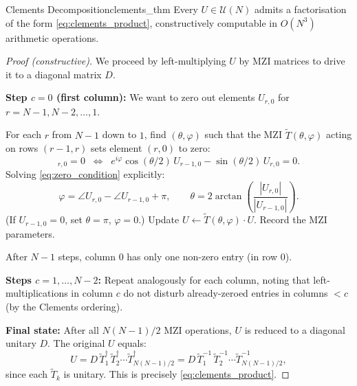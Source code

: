 \documentclass[12pt, a4paper]{article}
\newcommand{\calU}{\mathcal{U}}
\begin{document}
\begin{theorem}{Clements Decomposition}{clements_thm}
  Every $U\in\calU(N)$ admits a factorisation of the form
  \eqref{eq:clements_product}, constructively computable in $O(N^3)$ arithmetic
  operations.
\end{theorem}
\begin{proof}[Proof (constructive)]
  We proceed by left-multiplying $U$ by MZI matrices to drive it to a diagonal
  matrix $D$.

  \textbf{Step $c=0$ (first column):}
  We want to zero out elements $U_{r,0}$ for $r = N-1, N-2, \ldots, 1$.

  For each $r$ from $N-1$ down to $1$, find $(\theta,\varphi)$ such that the
  MZI $\widetilde{T}(\theta,\varphi)$ acting on rows $(r-1,r)$ sets element
  $(r,0)$ to zero:
  \begin{equation}
    [\widetilde{T}U]_{r,0} = 0
    \;\;\Longleftrightarrow\;\;
    e^{i\varphi}\cos(\theta/2)\,U_{r-1,0} - \sin(\theta/2)\,U_{r,0} = 0.
    \label{eq:zero_condition}
  \end{equation}
  Solving \eqref{eq:zero_condition} explicitly:
  \begin{equation}
    \varphi = \angle U_{r,0} - \angle U_{r-1,0} + \pi, \qquad
    \theta = 2\arctan\!\left(\frac{|U_{r,0}|}{|U_{r-1,0}|}\right).
    \label{eq:clements_angles}
  \end{equation}
  (If $U_{r-1,0}=0$, set $\theta=\pi$, $\varphi=0$.)
  Update $U \leftarrow \widetilde{T}(\theta,\varphi)\cdot U$.
  Record the MZI parameters.

  After $N-1$ steps, column 0 has only one non-zero entry (in row 0).

  \textbf{Steps $c=1,\ldots,N-2$:} Repeat analogously for each column, noting
  that left-multiplications in column $c$ do not disturb already-zeroed
  entries in columns $< c$ (by the Clements ordering).

  \textbf{Final state:} After all $N(N-1)/2$ MZI operations,
  $U$ is reduced to a diagonal unitary $D$.
  The original $U$ equals:
  \begin{equation}
    U = D\,\widetilde{T}_1^\dagger\,\widetilde{T}_2^\dagger\cdots
         \widetilde{T}_{N(N-1)/2}^\dagger
      = D\,\widetilde{T}_1^{-1}\,\widetilde{T}_2^{-1}\cdots
         \widetilde{T}_{N(N-1)/2}^{-1},
    \label{eq:clements_inverse}
  \end{equation}
  since each $\widetilde{T}_k$ is unitary.
  This is precisely \eqref{eq:clements_product}.
\end{proof}
\end{document}
